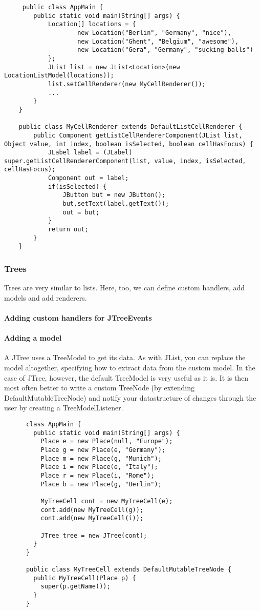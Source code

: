 \begin{lstlisting}
     public class AppMain {
    	public static void main(String[] args) {
    		Location[] locations = {
    				new Location("Berlin", "Germany", "nice"),
    				new Location("Ghent", "Belgium", "awesome"),
    				new Location("Gera", "Germany", "sucking balls")
    		};
    		JList list = new JList<Location>(new LocationListModel(locations));
    		list.setCellRenderer(new MyCellRenderer());
    		...
    	}
	}
	
	public class MyCellRenderer extends DefaultListCellRenderer {
    	public Component getListCellRendererComponent(JList list, Object value, int index, boolean isSelected, boolean cellHasFocus) {
    		JLabel label = (JLabel) super.getListCellRendererComponent(list, value, index, isSelected, cellHasFocus);
    		Component out = label;
    		if(isSelected) {
    			JButton but = new JButton();
    			but.setText(label.getText());
    			out = but;
    		}
    		return out;
    	}
    }
\end{lstlisting}
 
 
 \subsubsection{Trees}
 
 Trees are very similar to lists. Here, too, we can define custom handlers, add models and add renderers.
 
 \paragraph{Adding custom handlers for JTreeEvents}
 
 \paragraph{Adding a model} A JTree uses a TreeModel to get its data. As with JList, you can replace the model altogether, specifying how to extract data from the custom model. In the case of JTree, however, the default TreeModel is very useful as it is. It is then most often better to write a custom TreeNode (by extending DefaultMutableTreeNode) and notify your datastructure of changes through the user by creating a TreeModelListener.
 
 \begin{lstlisting}
      class AppMain {
        public static void main(String[] args) {
		  Place e = new Place(null, "Europe");
		  Place g = new Place(e, "Germany");
		  Place m = new Place(g, "Munich");
		  Place i = new Place(e, "Italy");
	 	  Place r = new Place(i, "Rome");
		  Place b = new Place(g, "Berlin");
		
		  MyTreeCell cont = new MyTreeCell(e);
		  cont.add(new MyTreeCell(g));
		  cont.add(new MyTreeCell(i));

		  JTree tree = new JTree(cont);
        }
      }
      
      public class MyTreeCell extends DefaultMutableTreeNode {
    	public MyTreeCell(Place p) {
		  super(p.getName());
    	}
      }
 \end{lstlisting}
 
